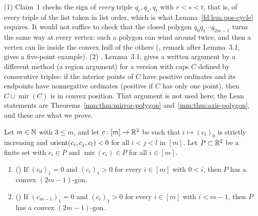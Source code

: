 \begin{remark}
(1) Claim~1 checks the sign of \emph{every} triple $q_r,q_s,q_t$ with $r<s<t$, that is, of every triple
of the list taken in list order, which is what Lemma~\ref{fd:lem:pos-cycle} requires. It would not suffice to check that the closed polygon
$q_0q_1\cdots q_{2m-1}$ turns the same way at every vertex: such a polygon can wind around twice, and then
a vertex can lie inside the convex hull of the others (, remark after Lemma~3.1,
gives a five-point example).
(2) , Lemma~3.1, gives a written argument by a different method (a region
argument) for a version with caps $C$ defined by consecutive triples: if the interior points of $C$ have
positive ordinates and its endpoints have nonnegative ordinates (positive if $C$ has only one point), then
$C\cup\operatorname{mir}(C)$ is in convex position. That argument is not used here; the Lean statements
are Theorems~\ref{mm:thm:mirror-polygon} and~\ref{mm:thm:axis-polygon}, and these are what we prove.
\end{remark}

\begin{theorem}\label{mm:thm:axis-polygon}
Let $m\in\mathbb N$ with $3\le m$, and let $c:[m]\to\mathbb R^2$ be such that $i\mapsto(c_i)_0$ is strictly increasing
and $\operatorname{orient}(c_i,c_j,c_l)<0$ for all $i<j<l$ in $[m]$. Let $P\subset\mathbb R^2$ be a finite set with $c_i\in P$
and $\operatorname{mir}(c_i)\in P$ for all $i\in[m]$.
\begin{enumerate}[label=(\alph*)]
\item () If $(c_0)_1=0$ and $(c_i)_1>0$ for every $i\in[m]$ with $0<i$, then $P$
  has a convex $(2m-1)$-gon.
\item () If $(c_{m-1})_1=0$ and $(c_i)_1>0$ for every $i\in[m]$ with $i<m-1$,
  then $P$ has a convex $(2m-1)$-gon.
\end{enumerate}
\end{theorem}

